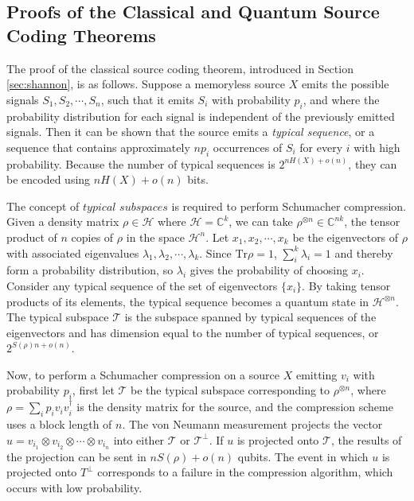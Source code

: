 \documentclass[a4paper, 12pt]{article}
\numberwithin{equation}{section}
\numberwithin{figure}{section}
\theoremstyle{definition}
\begin{document}
    \subsection{Proofs of the Classical and Quantum Source Coding Theorems}
    The proof of the classical source coding theorem, introduced in Section \ref{sec:shannon}, is as follows. Suppose a memoryless source $X$ emits the possible signals $S_1, S_2, \cdots, S_n$, such that it emits $S_i$ with probability $p_i$, and where the probability distribution for each signal is independent of the previously emitted signals. Then it can be shown that the source emits a \textit{typical sequence}, or a sequence that contains approximately $np_i$ occurrences of $S_i$ for every $i$ with high probability. Because the number of typical sequences is $2^{nH(X) + o(n)}$, they can be encoded using $nH(X) + o(n)$ bits. \par
    The concept of $\textit{typical subspaces}$ is required to perform Schumacher compression. Given a density matrix $\rho \in \mathcal{H}$ where $\mathcal{H} = \mathbb{C}^k$, we can take $\rho^{\otimes n} \in \mathbb{C}^{nk}$, the tensor product of $n$ copies of $\rho$ in the space $\mathcal{H}^n$. Let $x_1, x_2, \cdots, x_k$ be the eigenvectors of $\rho$ with associated eigenvalues $\lambda_1, \lambda_2, \cdots, \lambda_k$. Since $\text{Tr}\rho = 1$, $\sum_i^k \lambda_i = 1$ and thereby form a probability distribution, so $\lambda_i$ gives the probability of choosing $x_i$. Consider any typical sequence of the set of eigenvectors $\{ x_i \}$. By taking tensor products of its elements, the typical sequence becomes a quantum state in $\mathcal{H}^{\otimes n}$. The typical subspace $\mathcal{T}$ is the subspace spanned by typical sequences of the eigenvectors and has dimension equal to the number of typical sequences, or $2^{{S}(\rho)n + o(n)}$. \par
    Now, to perform a Schumacher compression on a source $X$ emitting $v_i$ with probability $p_i$, first let $\mathcal{T}$ be the typical subspace corresponding to $\rho^{\otimes n}$, where $\rho = \sum_i p_i v_i v_i^\dagger$ is the density matrix for the source, and the compression scheme uses a block length of $n$. The von Neumann measurement projects the vector $u = v_{i_1} \otimes v_{i_2} \otimes \cdots \otimes v_{i_n}$ into either $\mathcal{T}$ or $\mathcal{T}^\perp$. If $u$ is projected onto $\mathcal{T}$, the results of the projection can be sent in $n S(\rho) + o(n)$ qubits. The event in which $u$ is projected onto $T^\perp$ corresponds to a failure in the compression algorithm, which occurs with low probability. \par
\end{document}
